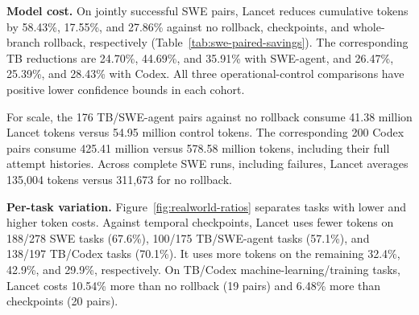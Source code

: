 \textbf{Model cost.}
On jointly successful SWE pairs, Lancet reduces cumulative tokens by
58.43\%, 17.55\%, and 27.86\% against no rollback, checkpoints, and
whole-branch rollback, respectively (Table~\ref{tab:swe-paired-savings}).
The corresponding TB reductions are 24.70\%, 44.69\%, and 35.91\% with
SWE-agent, and 26.47\%, 25.39\%, and 28.43\% with Codex.
All three operational-control comparisons have positive lower confidence
bounds in each cohort.

For scale, the 176 TB/SWE-agent pairs against no rollback consume 41.38
million Lancet tokens versus 54.95 million control tokens.
The corresponding 200 Codex pairs consume 425.41 million versus 578.58
million tokens, including their full attempt histories.
Across complete SWE runs, including failures, Lancet averages 135,004 tokens
versus 311,673 for no rollback.

\textbf{Per-task variation.}
Figure~\ref{fig:realworld-ratios} separates tasks with lower and higher
token costs. Against temporal checkpoints, Lancet uses fewer tokens on
188/278 SWE tasks (67.6\%), 100/175 TB/SWE-agent tasks (57.1\%), and
138/197 TB/Codex tasks (70.1\%). It uses more tokens on the remaining
32.4\%, 42.9\%, and 29.9\%, respectively.
On TB/Codex machine-learning/training tasks,
Lancet costs 10.54\% more than no rollback (19 pairs) and 6.48\% more than
checkpoints (20 pairs).

